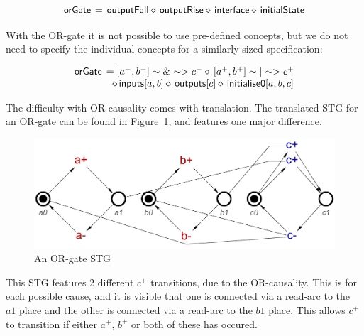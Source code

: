 \documentclass[british, journal]{IEEEtran}
\begin{document}
\[
\begin{array}{lcl}
\mathsf{orGate}&\hspace{-2mm}=&\hspace{-2mm}\mathsf{outputFall} \diamond\, \mathsf{outputRise} \diamond\, \mathsf{interface} 
\diamond\, \mathsf{initialState}
\end{array}
\]

With the OR-gate it is not possible to use pre-defined concepts, but we do not need to
specify the individual concepts for a similarly sized specification:

 \[
\begin{array}{lcl}
\mathsf{orGate}&\hspace{-2mm}=[a^{-}, b^{-}] \sim\&\sim> c^{-} \diamond\, [a^{+}, b^{+}] \sim|\sim> c^{+} \\
&\diamond\, \mathsf{inputs}[a, b] \diamond\, \mathsf{outputs}[c] \diamond\, \mathsf{initialise0} [a, b, c]
\end{array}
\]

The difficulty with OR-causality comes with translation. The translated STG for an OR-gate
can be found in Figure~\ref{fig:or-gate-stg}, and features one major difference.

\begin{figure}[h]
\begin{centering}
\includegraphics[scale=0.32]{Images/or-gate-stg}
\par\end{centering}
\vspace{-1mm}
\protect\caption{\label{fig:or-gate-stg} An OR-gate STG}
\vspace{-3mm}
\end{figure}

This STG features 2 different $c^{+}$ transitions, due to the OR-causality. 
This is for each possible cause, and it is visible that one is connected via a 
read-arc to the $a1$ place and the other is connected via a read-arc to 
the $b1$ place. This allows $c^{+}$ to transition if either $a^{+}$, 
$b^{+}$ or both of these has occured.
\end{document}

